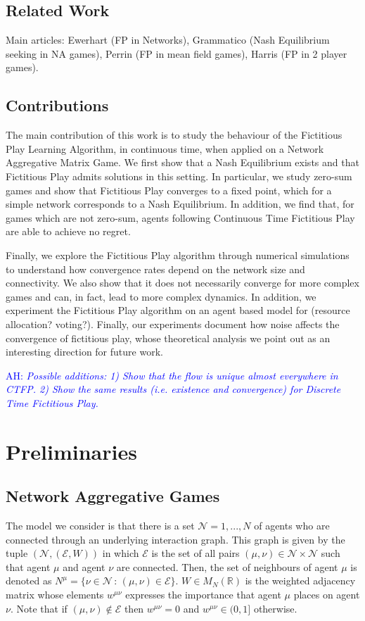 \documentclass{article}
\theoremstyle{definition}
\newcommand{\ah}[1]{\textcolor{blue}{AH: \textit{#1}}}
\newcommand{\agentset}{\mathcal{N}}
\newcommand{\edgeset}{\mathcal{E}}
\newcommand{\weightset}{W}
\newcommand{\wmunu}{w^{\mu \nu}}
\begin{document}
		\subsection{Related Work}
		Main articles: Ewerhart (FP in Networks), Grammatico (Nash Equilibrium seeking in NA games), Perrin (FP in mean field games), Harris (FP in 2 player games).
		\subsection{Contributions}

		The main contribution of this work is to study the behaviour of the Fictitious Play Learning Algorithm, in continuous time, when applied on a Network Aggregative Matrix Game. We first show that a Nash Equilibrium exists and that Fictitious Play admits solutions in this setting. In particular, we study zero-sum games and show that Fictitious Play converges to a fixed point, which for a simple network corresponds to a Nash Equilibrium. In addition, we find that, for games which are not zero-sum, agents following Continuous Time Fictitious Play are able to achieve no regret.

		Finally, we explore the Fictitious Play algorithm through numerical simulations to understand how convergence rates depend on the network size and connectivity. We also show that it does not necessarily converge for more complex games and can, in fact, lead to more complex dynamics. In addition, we experiment the Fictitious Play algorithm on an agent based model for (resource allocation? voting?). Finally, our experiments document how noise affects the convergence of fictitious play, whose theoretical analysis we point out as an interesting direction for future work.

		\ah{Possible additions: 1) Show that the flow is unique almost everywhere in CTFP. 2) Show the same results (i.e. existence and convergence) for Discrete Time Fictitious Play.}
		\section{Preliminaries}
	\subsection{Network Aggregative Games}
	\label{sec::NAG}

	The model we consider is that there is a set $\agentset = {1, ... ,
	N}$ of agents who are connected through an underlying interaction graph. This graph is given by
	the tuple $(\agentset, (\edgeset, \weightset))$ in which $\edgeset$ is the set of all pairs $(\mu,
	\nu) \in \agentset \times \agentset$ such that agent $\mu$ and agent $\nu$ are connected. Then,
	the set of neighbours of agent $\mu$ is denoted as $N^\mu = \{\nu \in \agentset \, : \, (\mu,
	\nu) \in \edgeset\}$. $\weightset
	\in M_N(\mathbb{R})$ is the weighted adjacency matrix whose elements $w^{\mu \nu}$ expresses the
	importance that agent $\mu$ places on agent $\nu$. Note that if $(\mu, \nu) \not \in \edgeset$
	then $w^{\mu \nu} = 0$ and $\wmunu \in (0, 1]$ otherwise.
\end{document}
